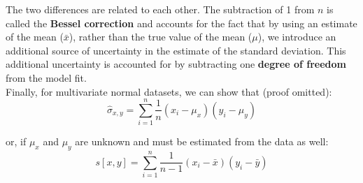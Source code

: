 The two differences are related to each other. The subtraction of 1
from $n$ is called the \textbf{Bessel correction} and accounts for the
fact that by using an estimate of the mean ($\bar{x}$), rather than
the true value of the mean ($\mu$), we introduce an additional source
of uncertainty in the estimate of the standard deviation. This
additional uncertainty is accounted for by subtracting one
\textbf{degree of freedom} from the model fit.\\

Finally, for multivariate normal datasets, we can show that (proof
omitted):
\begin{equation}
  \hat{\sigma}_{x,y} = \sum\limits_{i=1}^{n}\frac{1}{n}(x_i-\mu_x)(y_i-\mu_y)
\end{equation}

\noindent or, if $\mu_x$ and $\mu_y$ are unknown and must be estimated
from the data as well:
\begin{equation}
  s[x,y] = \sum\limits_{i=1}^{n}\frac{1}{n-1}(x_i-\bar{x})(y_i-\bar{y})
  \label{eq:sxy}
\end{equation}

